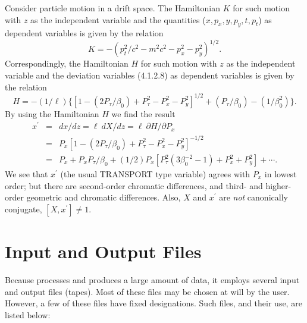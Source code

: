 Consider particle motion in a drift space.  The Hamiltonian $K$ for such
motion with $z$ as the independent variable and the quantities ($x, p_x,
y, p_y, t, p_t$) as dependent variables is given by the relation
\begin{equation}
K = -(p^2_t/c^2 - m^2c^2 - p^2_x - p^2_y)^{1/2}.
\end{equation}
Correspondingly, the Hamiltonian $H$ for such motion with $z$ as the
independent variable and the deviation variables (4.1.2.8) as dependent
variables is given by the relation
\begin{equation}
H = -(1/\ell )\{ [1-(2P_{\tau}/\beta_0) +P^2_{\tau} - P^2_x -
P^2_y]^{1/2} + (P_{\tau}/\beta_0) - (1/\beta^2_0)\}.
\end{equation}
By using the Hamiltonian $H$ we find the result
\begin{eqnarray}
x^{\prime} & = & dx/dz = \ell \ dX/dz = \ell \ \partial H/\partial P_x
\nonumber \\
& = & P_x [1-(2P_{\tau}/\beta_0) + P^2_{\tau} - P^2_x - P^2_y]^{-1/2}
\nonumber \\
& = & P_x + P_xP_{\tau}/\beta_0 + (1/2)P_x[P^2_{\tau} (3\beta_0^{-2} -1)
+ P^2_x + P^2_y] + \cdots.
\end{eqnarray}
We see that $x^{\prime}$ (the usual TRANSPORT type variable) agrees with
$P_x$ in lowest order; but there are second-order chromatic
differences, and third- and higher-order geometric and chromatic
differences.  Also, $X$ and $x^{\prime}$ are {\em not} canonically conjugate,
$[X,x^{\prime}] \neq 1$.

\section{Input and Output Files}
     Because \Mary processes and produces a large amount of data, it
employs several input and output files (tapes).  Most of these files may be
chosen at will by the user.  However, a few of these files have fixed
designations.  Such files, and their use, are listed below:


